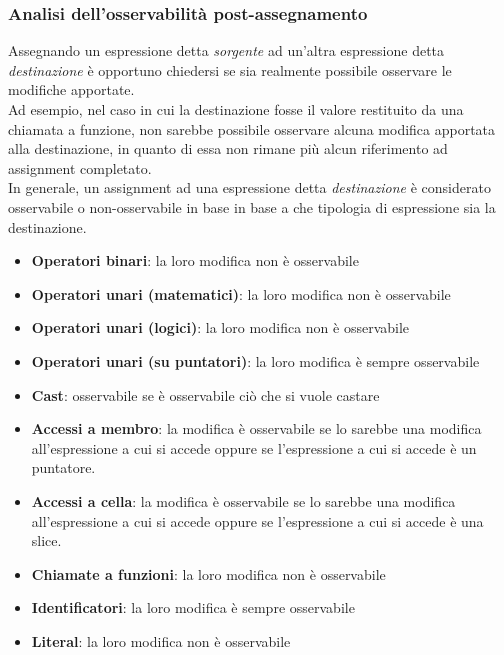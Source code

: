 \subsubsection{Analisi dell'osservabilità post-assegnamento}
Assegnando un espressione detta \textit{sorgente} ad un'altra espressione detta \textit{destinazione}
è opportuno chiedersi se sia realmente possibile osservare le modifiche apportate. \\

Ad esempio, nel caso in cui la destinazione fosse il valore restituito da una chiamata a funzione, 
non sarebbe possibile osservare alcuna modifica apportata alla destinazione, in quanto di essa non 
rimane più alcun riferimento ad assignment completato. \\

In generale, un assignment ad una espressione detta \textit{destinazione} è
considerato osservabile o non-osservabile in base in base a che tipologia di 
espressione sia la destinazione. \\

\vspace{0.5cm}
\begin{itemize}
    \item \textbf{Operatori binari}: la loro modifica non è osservabile
    \item \textbf{Operatori unari (matematici)}: la loro modifica non è osservabile
    \item \textbf{Operatori unari (logici)}: la loro modifica non è osservabile
    \item \textbf{Operatori unari (su puntatori)}: la loro modifica è sempre osservabile
    \item \textbf{Cast}: osservabile se è osservabile ciò che si vuole castare
    \item \textbf{Accessi a membro}: la modifica è osservabile se lo sarebbe una modifica 
    all'espressione a cui si accede oppure se l'espressione a cui si accede è un puntatore.
    \item \textbf{Accessi a cella}: la modifica è osservabile se lo sarebbe una modifica 
    all'espressione a cui si accede oppure se l'espressione a cui si accede è una slice.
    \item \textbf{Chiamate a funzioni}: la loro modifica non è osservabile
    \item \textbf{Identificatori}: la loro modifica è sempre osservabile
    \item \textbf{Literal}: la loro modifica non è osservabile
\end{itemize}
\vspace{0.5cm}


